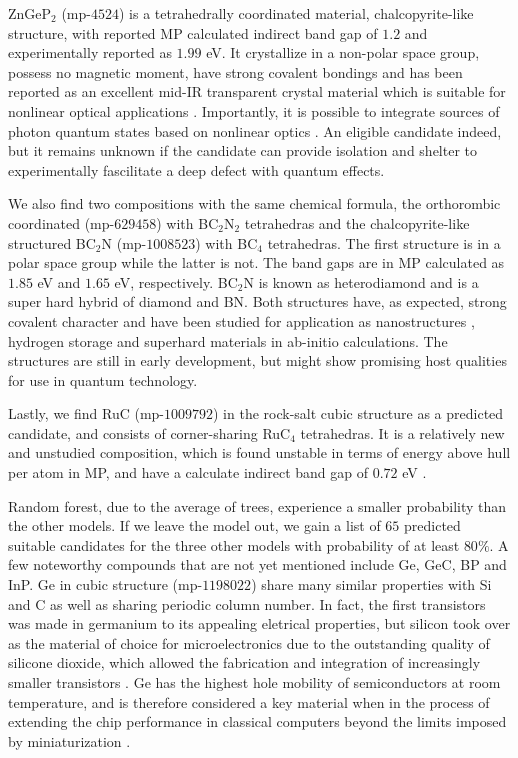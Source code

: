 ZnGeP$_2$ (mp-$4524$) is a tetrahedrally coordinated material, chalcopyrite-like structure, with reported MP calculated indirect band gap of $1.2$ \cite{Zhang2015} and experimentally reported as $1.99$ eV\cite{Xing1989}. It crystallize in a non-polar space group, possess no magnetic moment, have strong covalent bondings and has been reported as an excellent mid-IR transparent crystal material which is suitable for nonlinear optical applications \cite{Zhang2015}. Importantly, it is possible to integrate sources of photon quantum states based on nonlinear optics \cite{Caspani2017}. An eligible candidate indeed, but it remains unknown if the candidate can provide isolation and shelter to experimentally fascilitate a deep defect with quantum effects.

We also find two compositions with the same chemical formula, the orthorombic coordinated (mp-$629458$) with BC$_2$N$_2$ tetrahedras and the chalcopyrite-like structured BC$_2$N (mp-$1008523$) with BC$_4$ tetrahedras. The first structure is in a polar space group while the latter is not. The band gaps are in MP calculated as $1.85$ eV and $1.65$ eV, respectively. BC$_2$N is known as heterodiamond and is a super hard hybrid of diamond and BN. Both structures have, as expected, strong covalent character and have been studied for application as nanostructures \cite{Gao2017}, hydrogen storage \cite{Cai2017} and superhard materials \cite{Li2017, Jiang2020} in ab-initio calculations. The structures are still in early development, but might show promising host qualities for use in quantum technology.

Lastly, we find RuC (mp-$1009792$) in the rock-salt cubic structure as a predicted candidate, and consists of corner-sharing RuC$_4$ tetrahedras. It is a relatively new and unstudied composition, which is found unstable in terms of energy above hull per atom in MP, and have a calculate indirect band gap of $0.72$ eV \cite{RuC2020}.

Random forest, due to the average of trees, experience a smaller probability than the other models. If we leave the model out, we gain a list of $65$ predicted suitable candidates for the three other models with probability of at least $80\%$. A few noteworthy compounds that are not yet mentioned include Ge, GeC, BP and InP. Ge in cubic structure (mp-$1198022$) share many similar properties with Si and C as well as sharing periodic column number. In fact, the first transistors was made in germanium to its appealing eletrical properties, but silicon took over as the material of choice for microelectronics due to the outstanding quality of silicone dioxide, which allowed the fabrication and integration of increasingly smaller transistors \cite{Scappucci2020, Pillarisetty2011}. Ge has the highest hole mobility of semiconductors at room temperature, and is therefore considered a key material when in the process of extending the chip performance in classical computers beyond the limits imposed by miniaturization \cite{Scappucci2020}.

